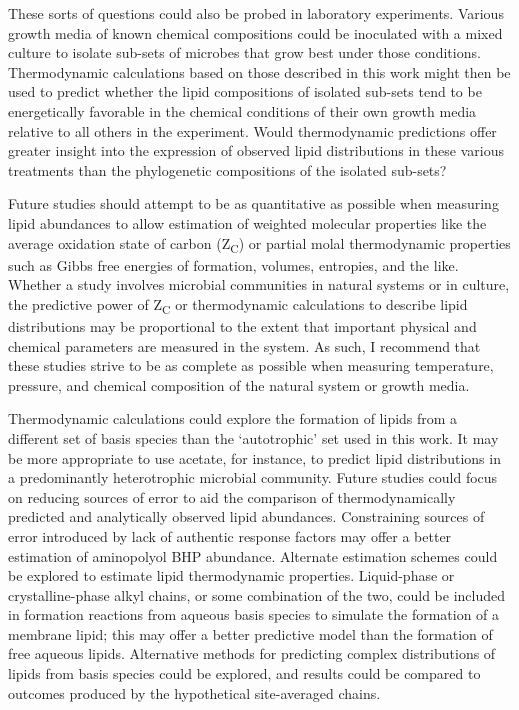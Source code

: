 These sorts of questions could also be probed in laboratory experiments. Various growth media of known chemical compositions could be inoculated with a mixed culture to isolate sub-sets of microbes that grow best under those conditions. Thermodynamic calculations based on those described in this work might then be used to predict whether the lipid compositions of isolated sub-sets tend to be energetically favorable in the chemical conditions of their own growth media relative to all others in the experiment. Would thermodynamic predictions offer greater insight into the expression of observed lipid distributions in these various treatments than the phylogenetic compositions of the isolated sub-sets?

Future studies should attempt to be as quantitative as possible when measuring lipid abundances to allow estimation of weighted molecular properties like the average oxidation state of carbon (Z\textsubscript{C}) or partial molal thermodynamic properties such as Gibbs free energies of formation, volumes, entropies, and the like. Whether a study involves microbial communities in natural systems or in culture, the predictive power of Z\textsubscript{C} or thermodynamic calculations to describe lipid distributions may be proportional to the extent that important physical and chemical parameters are measured in the system. As such, I recommend that these studies strive to be as complete as possible when measuring temperature, pressure, and chemical composition of the natural system or growth media.

Thermodynamic calculations could explore the formation of lipids from a different set of basis species than the `autotrophic' set used in this work. It may be more appropriate to use acetate, for instance, to predict lipid distributions in a predominantly heterotrophic microbial community. Future studies could focus on reducing sources of error to aid the comparison of thermodynamically predicted and analytically observed lipid abundances. Constraining sources of error introduced by lack of authentic response factors may offer a better estimation of aminopolyol BHP abundance. Alternate estimation schemes could be explored to estimate lipid thermodynamic properties. Liquid-phase or crystalline-phase alkyl chains, or some combination of the two, could be included in formation reactions from aqueous basis species to simulate the formation of a membrane lipid; this may offer a better predictive model than the formation of free aqueous lipids. Alternative methods for predicting complex distributions of lipids from basis species could be explored, and results could be compared to outcomes produced by the hypothetical site-averaged chains.

